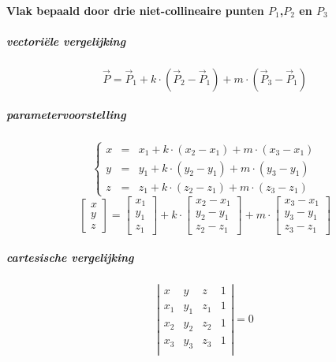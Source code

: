 \paragraph{Vlak bepaald door drie niet-collineaire punten $P_1$,$P_2$ en $P_3$}
\label{sec:VlakPuntPuntPunt}
 \subparagraph{vectoriële vergelijking}
  \label{sec:VlakPuntPuntPuntVECTOR}
 \[
   \vec P = \vec P_1 + k \cdot \left(\vec P_2 - \vec P_1\right)  + m \cdot \left(\vec P_3 - \vec P_1\right)
 \]
 \subparagraph{parametervoorstelling}
  \label{sec:VlakPuntPuntPuntPARAM}
 \[
       \left\{
       \begin{array}{rcl}
         x &=& x_1 + k \cdot \left(x_2 - x_1\right) + m \cdot \left(x_3 - x_1\right)\\
         y &=& y_1 + k \cdot \left(y_2 - y_1\right) + m \cdot \left(y_3 - y_1\right)\\
         z &=& z_1 + k \cdot \left(z_2 - z_1\right) + m \cdot \left(z_3 - z_1\right)
       \end{array}%
     \right. 
 \]
 \[ 
     \left[
       \begin{array}{c}
         x\\ y\\ z
       \end{array}
     \right]
     =
     \left[
       \begin{array}{c}
         x_1\\ y_1\\ z_1
       \end{array}
     \right]
     + k \cdot
     \left[
       \begin{array}{c}
         x_2 - x_1\\
         y_2 - y_1\\
         z_2 - z_1
       \end{array}
     \right]
     + m \cdot
     \left[
       \begin{array}{c}
         x_3 - x_1\\
         y_3 - y_1\\
         z_3 - z_1
       \end{array}
     \right]
 \]
 \subparagraph{cartesische vergelijking}
  \label{sec:VlakPuntPuntPuntCART}
 \[
   \left|
     \begin{array}{cccc}
       x  &  y  &  z  & 1\\
      x_1 & y_1 & z_1 & 1\\
      x_2 & y_2 & z_2 & 1\\
      x_3 & y_3 & z_3 & 1\\
     \end{array}
   \right|
    = 0  
 \]
 
